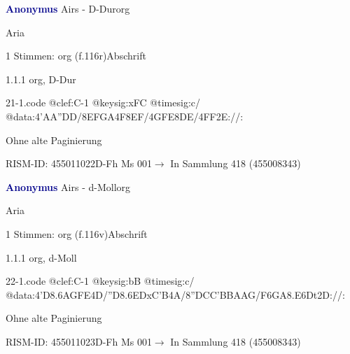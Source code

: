 \documentclass[twocolumn]{book}
\begin{document}
\par \vspace{7pt} \textcolor{darkblue}{\textbf{Anonymus  }}\hfillplus{\textbf{[21]}}\newline Airs - D-Dur\newline org
\par \begin{itshape}[f.116r, heading:] Aria\end{itshape} 
\par \textcolor{darkblue}{}  1 Stimmen: org  (f.116r)\newline Abschrift
\par 1.1.1  org, D-Dur  
\begin{filecontents*}{21-1.code}
@clef:C-1
@keysig:xFC
@timesig:c/
@data:4'AA''DD/{8EFGA}4F{8EF}/4GFE{8DE}/4FF2E://:
\end{filecontents*}
\newline
%
\par Ohne alte Paginierung
\par RISM-ID: 455011022\newline D-Fh  Ms 001\newline $\rightarrow$ In Sammlung 418 (455008343)
      
\par \vspace{7pt} \textcolor{darkblue}{\textbf{Anonymus  }}\hfillplus{\textbf{[22]}}\newline Airs - d-Moll\newline org
\par \begin{itshape}[f.116v, heading:] Aria\end{itshape} 
\par \textcolor{darkblue}{}  1 Stimmen: org  (f.116v)\newline Abschrift
\par 1.1.1  org, d-Moll  
\begin{filecontents*}{22-1.code}
@clef:C-1
@keysig:bB
@timesig:c/
@data:4'D{8.6AG}{FE}4D/''D{8.6ED}{xC'B}4A/{8''DC}{C'B}{BA}{AG}/{F6GA}{8.E6Dt}2D://:
\end{filecontents*}
\newline
%
\par Ohne alte Paginierung
\par RISM-ID: 455011023\newline D-Fh  Ms 001\newline $\rightarrow$ In Sammlung 418 (455008343)
      
\end{document}
